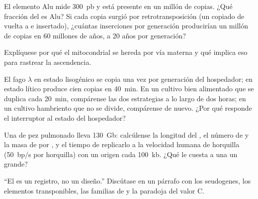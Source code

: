 \begin{exercise}[$\star\star$]\label{exo:b1:genomes:8}
El elemento Alu mide \qty{300}{pb} y está presente en un millón de copias.
¿Qué fracción del  es Alu? Si cada copia surgió por
retrotransposición (un  copiado de vuelta a  e insertado), ¿cuántas
inserciones por generación producirían un millón de copias en \num{60}
millones de años, a \num{20} años por generación?
\end{exercise}

\begin{exercise}[$\star\star$]\label{exo:b1:genomes:9}
Explíquese por qué el  mitocondrial se hereda por vía materna y qué
implica eso para rastrear la ascendencia.
\end{exercise}

\begin{exercise}[$\star\star\star$]\label{exo:b1:genomes:10}
El fago $\lambda$ en estado lisogénico se copia una vez por generación del
hospedador; en estado lítico produce cien copias en \qty{40}{min}. En un
cultivo bien alimentado que se duplica cada \qty{20}{min}, compárense las
dos estrategias a lo largo de dos horas; en un cultivo hambriento que no se
divide, compárense de nuevo. ¿Por qué responde el interruptor al estado del
hospedador?
\end{exercise}

\begin{exercise}[$\star\star\star$]\label{exo:b1:genomes:11}
Una  de pez pulmonado lleva \qty{130}{Gb}: calcúlense la longitud del
, el número de  y la masa de  por , y el tiempo
de replicarlo a la velocidad humana de horquilla (\qty{50}{bp/s} por
horquilla) con un origen cada \qty{100}{kb}. ¿Qué le cuesta a una  un
 grande?
\end{exercise}

\begin{exercise}[$\star\star\star$]\label{exo:b1:genomes:12}
``El  es un registro, no un diseño.'' Discútase en un párrafo con los
seudogenes, los elementos transponibles, las familias de  y la paradoja
del valor C.
\end{exercise}

